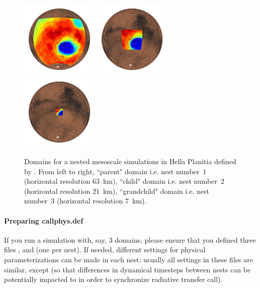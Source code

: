 \vskip -0.2cm
\scriptsize
{}
\normalsize

\begin{center} 
\begin{figure}[h!]
\includegraphics[width=0.33\textwidth]{LMD_MMM_d1_63km_domain_100.png} 
\includegraphics[width=0.33\textwidth]{LMD_MMM_d2_21km_domain_100.png}
\includegraphics[width=0.33\textwidth]{LMD_MMM_d3_7km_domain_100.png}
\caption{\label{nesteddomains} Domains for a nested mesoscale simulations in Hella Planitia defined by . From left to right, ``parent" domain i.e. nest number~$1$ (horizontal resolution $63$~km), ``child" domain i.e. nest number~$2$ (horizontal resolution $21$~km), ``grandchild" domain i.e. nest number~$3$ (horizontal resolution $7$~km).}
\end{figure}
\end{center}

\paragraph{Preparing callphys.def} If you run a simulation with, say, $3$ domains, please ensure that you defined three files ,  and  (one per nest). If needed, different settings for physical parameterizations can be made in each nest; usually all settings in these files are similar, except  (so that differences in dynamical timesteps between nests can be potentially impacted to  in order to synchronize radiative transfer call).

